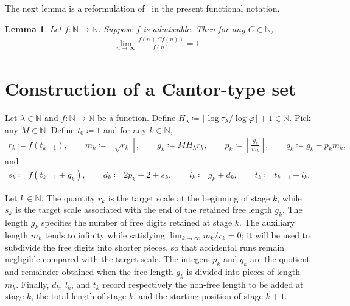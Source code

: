 \documentclass[10pt,a4paper]{amsart}
\newtheorem{lemma}{Lemma}
\begin{document}
The next lemma is a reformulation of~\cite[Lemma~2.5]{WangWu2011} in the present functional notation.
\begin{lemma}
\label{lem:fixed-multiple-self-neglecting}
Let $f:\mathbb{N}\to\mathbb{N}$. 
Suppose $f$ is admissible. 
Then for any $C\in\mathbb{N}$,
\begin{align*}
    \lim_{n\to\infty}\frac{f(n+C f(n))}{f(n)}
    =1.
\end{align*}
\end{lemma}

\section{Construction of a Cantor-type set}

Let $\lambda\in\mathbb{N}$ and $f:\mathbb{N}\to\mathbb{N}$ be a function. Define $H_\lambda\coloneqq\lfloor{\log{\tau_{\lambda}}}/{\log{\varphi}}\rfloor+1\in\mathbb{N}$. Pick any $M\in\mathbb{N}$. Define $t_0\coloneqq 1$ and for any $k\in\mathbb{N}$,
\begin{align*}
    r_k\coloneqq f(t_{k-1}),\qquad
    m_k\coloneqq \left\lfloor\sqrt{r_k}\right\rfloor, \qquad
    g_k\coloneqq MH_\lambda r_k, \qquad
    p_k\coloneqq \left\lfloor \frac{g_k}{m_k}\right\rfloor, \qquad
    q_k\coloneqq g_k-p_km_k,
\end{align*}
and
\begin{align*}
    s_k\coloneqq f(t_{k-1}+g_k), \qquad 
    d_k\coloneqq 2p_k+2+s_k, \qquad 
    l_k\coloneqq g_k+d_k, \qquad 
    t_k\coloneqq t_{k-1}+l_k.
\end{align*}

Let $k\in\mathbb{N}$. The quantity $r_k$ is the target scale at the beginning of stage $k$, while $s_k$ is the target scale associated with the end of the retained free length $g_k$. The length $g_k$ specifies the number of free digits retained at stage $k$. The auxiliary length $m_k$ tends to infinity while satisfying $\lim_{k\to\infty}m_k/r_k=0$; it will be used to subdivide the free digits into shorter pieces, so that accidental runs remain negligible compared with the target scale. The integers $p_k$ and $q_k$ are the quotient and remainder obtained when the free length $g_k$ is divided into pieces of length $m_k$. Finally, $d_k$, $l_k$, and $t_k$ record respectively the non-free length to be added at stage $k$, the total length of stage $k$, and the starting position of stage $k+1$.
\end{document}
